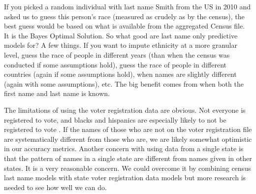 \documentclass[12pt, letterpaper]{article}
\begin{document}
If you picked a random individual with last name Smith from the US in 2010 and asked us to guess this person's race (measured as crudely as by the census), the best guess would be based on what is available from the aggregated Census file. It is the Bayes Optimal Solution. So what good are last name only predictive models for? A few things. If you want to impute ethnicity at a more granular level, guess the race of people in different years (than when the census was conducted if some assumptions hold), guess the race of people in different countries (again if some assumptions hold), when names are slightly different (again with some assumptions), etc. The big benefit comes from when both the first name and last name is known.

The limitations of using the voter registration data are obvious. Not everyone is registered to vote, and blacks and hispanics are especially likely to not be registered to vote \citep{ansolabehere2011gender}. If the names of those who are not on the voter registration file are systematically different from those who are, we are likely somewhat optimistic in our accuracy metrics. Another concern with using data from a single state is that the pattern of names in a single state are different from names given in other states. It is a very reasonable concern. We could overcome it by combining census last name models with state voter registration data models but more research is needed to see how well we can do.

\clearpage


\end{document}
